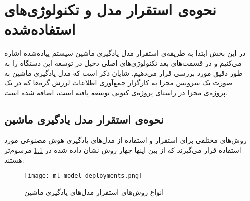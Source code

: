 \chapter{نحوه‌ی استقرار مدل و تکنولوژی‌های استفاده‌شده}

در این بخش ابتدا به طریقه‌ی استقرار مدل یادگیری ماشین سیستم پیاده‌شده اشاره می‌کنیم و در قسمت‌های بعد تکنولوژی‌های اصلی دخیل در توسعه این دستگاه را به طور دقیق مورد بررسی قرار می‌دهیم. شایان ذکر است که مدل یادگیری ماشین به صورت یک سرویس مجزا به کارگزار جمع‌آوری اطلاعات لرزش گره‌ها که در یک پروژه‌ی مجزا در راستای پروژه‌ی کنونی توسعه یافته است، اضافه شده است.

\section{نحوه‌ی استقرار مدل یادگیری ماشین}
 روش‌های مختلفی برای استقرار و استفاده از مدل‌های یادگیری هوش مصنوعی مورد استفاده قرار می‌گیرند که از بین اینها چهار روش نشان داده‌ شده در \cref{fig:ml_model_deployments} مرسوم‌تر هستند\cite{kaggleMLdeployments}:

\begin{figure}[!h]
\centerline{\texttt{[image: ml\_model\_deployments.png]}}
\caption{انواع روش‌های استقرار مدل‌های یادگیری ماشین}
\label{fig:ml_model_deployments}
\end{figure}

